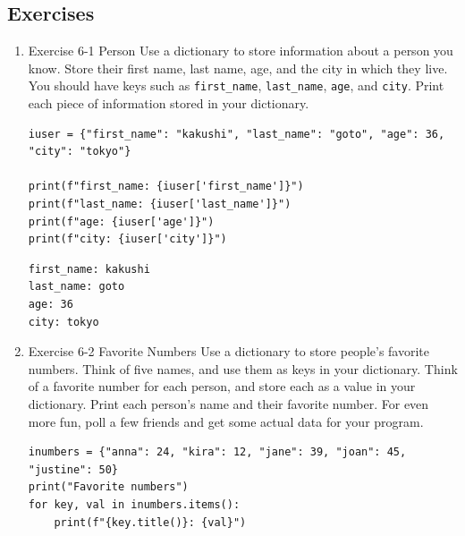 \documentclass[10pt]{book}
\begin{document}
\subsection{Exercises}
\label{sec:org1c227e1}
\begin{enumerate}
\item Exercise 6-1 Person
\label{sec:org9568586}
Use a dictionary to store information about a person you know. Store their first name, last name, age, and the city in which they live. You should have keys such as \texttt{first\_name}, \texttt{last\_name}, \texttt{age}, and \texttt{city}. Print each piece of information stored in your dictionary.
\begin{verbatim}
iuser = {"first_name": "kakushi", "last_name": "goto", "age": 36, "city": "tokyo"}

print(f"first_name: {iuser['first_name']}")
print(f"last_name: {iuser['last_name']}")
print(f"age: {iuser['age']}")
print(f"city: {iuser['city']}")
\end{verbatim}

\label{orgddfbb51}
\begin{verbatim}
first_name: kakushi
last_name: goto
age: 36
city: tokyo
\end{verbatim}
\item Exercise 6-2 Favorite Numbers
\label{sec:org1e81889}
Use a dictionary to store people’s favorite numbers. Think of five names, and use them as keys in your dictionary. Think of a favorite number for each person, and store each as a value in your dictionary. Print each person’s name and their favorite number. For even more fun, poll a few friends and get some actual data for your program.
\begin{verbatim}
inumbers = {"anna": 24, "kira": 12, "jane": 39, "joan": 45, "justine": 50}
print("Favorite numbers")
for key, val in inumbers.items():
    print(f"{key.title()}: {val}")
\end{verbatim}


\end{enumerate}
\end{document}
